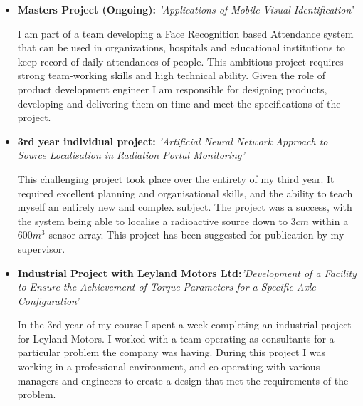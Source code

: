 \documentclass[11pt,a4paper,sans]{moderncv}        %
\begin{document}
\begin{itemize}

\item{\textbf{Masters Project (Ongoing):} \textit{'Applications of Mobile Visual Identification'}

\vspace{3pt}

\small{I am part of a team developing a Face Recognition based Attendance system that can be used in organizations, hospitals and educational institutions to keep record of daily attendances of people. This ambitious project requires strong team-working skills and high technical ability. Given the role of product development engineer I am responsible for designing products, developing and delivering them on time and meet the specifications of the project.}}

\newpage

\item{\textbf{3rd year individual project:} \textit{'Artificial Neural Network Approach to Source Localisation in Radiation Portal Monitoring'}

\vspace{3pt}

\small{This challenging project took place over the entirety of my third year. It required excellent planning and organisational skills, and the ability to teach myself an entirely new and complex subject. The project was a success, with the system being able to localise a radioactive source down to $ 3 cm$ within a $ 600 m^3$ sensor array. This project has been suggested for publication by my supervisor.}}

\vspace{6pt}

\item{\textbf{Industrial Project with Leyland Motors Ltd:}\textit{'Development of a Facility to Ensure the Achievement of Torque Parameters for a Specific Axle Configuration'}

\vspace{3pt}

\small{In the 3rd year of my course I spent a week completing an industrial project for Leyland Motors. I worked with a team operating as consultants for a particular problem the company was having. During this project I was working in a professional environment, and co-operating with various managers and engineers to create a design that met the requirements of the problem.}}

\end{itemize}
\end{document}
